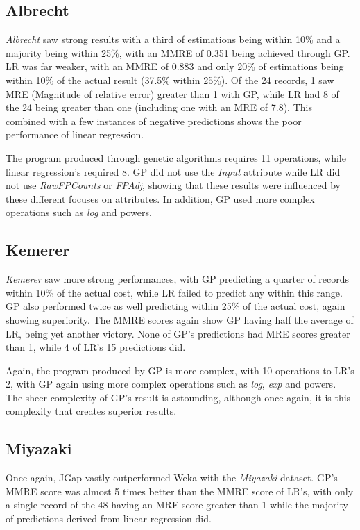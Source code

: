 \documentclass[11pt, a4paper]{article}
\begin{document}
\subsection{Albrecht} %
\label{sub:albrecht_comp}
\emph{Albrecht} saw strong results with a third of estimations being within 10\%
and a majority being within 25\%, with an MMRE of 0.351 being achieved through
GP. LR was far weaker, with an MMRE of 0.883 and only 20\% of estimations being
within 10\% of the actual result (37.5\% within 25\%). Of the 24 records, 1 saw
MRE (Magnitude of relative error) greater than 1 with GP, while LR had 8 of the
24 being greater than one (including one with an MRE of 7.8). This combined with
a few instances of negative predictions shows the poor performance of linear
regression.

The program produced through genetic algorithms requires 11 operations, while
linear regression's required 8. GP did not use the \emph{Input} attribute while
LR did not use \emph{RawFPCounts} or \emph{FPAdj}, showing that these results
were influenced by these different focuses on attributes. In addition, GP used
more complex operations such as \emph{log} and powers.

\subsection{Kemerer} %
\label{sub:kemerer_comp}
\emph{Kemerer} saw more strong performances, with GP predicting a quarter of
records within 10\% of the actual cost, while LR failed to predict any within
this range. GP also performed twice as well predicting within 25\% of the actual
cost, again showing superiority. The MMRE scores again show GP having half the
average of LR, being yet another victory. None of GP's predictions had MRE
scores greater than 1, while 4 of LR's 15 predictions did.

Again, the program produced by GP is more complex, with 10 operations to LR's 2,
with GP again using more complex operations such as \emph{log}, \emph{exp} and
powers. The sheer complexity of GP's result is astounding, although once again,
it is this complexity that creates superior results.

\subsection{Miyazaki} %
\label{sub:miyazaki_comp}
Once again, JGap vastly outperformed Weka with the \emph{Miyazaki} dataset.
GP's MMRE score was almost 5 times better than the MMRE score of LR's, with only
a single record of the 48 having an MRE score greater than 1 while the majority
of predictions derived from linear regression did.
\end{document}

